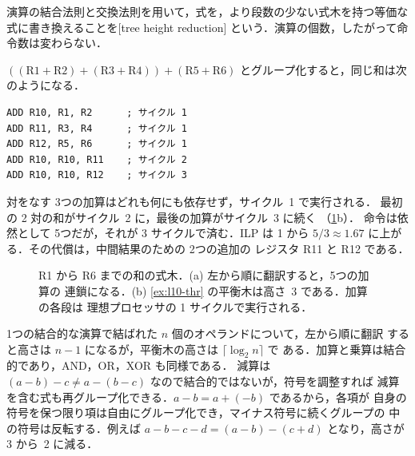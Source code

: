 \documentclass[../main.tex]{subfiles}
\begin{document}
\begin{definition}[木の高さ削減]
  \label{def:l10-thr}
  演算の結合法則と交換法則を用いて，式を，より段数の少ない式木を持つ等価な
  式に書き換えることを[tree height reduction]%
  という．演算の個数，したがって命令数は変わらない．
\end{definition}

\begin{example}
  \label{ex:l10-thr}
  $((\text{R1}+\text{R2}) + (\text{R3}+\text{R4})) +
  (\text{R5}+\text{R6})$ とグループ化すると，同じ和は次のようになる．
  \begin{lstlisting}[language={[x86masm]Assembler}, numbers=none]
ADD R10, R1, R2      ; サイクル 1
ADD R11, R3, R4      ; サイクル 1
ADD R12, R5, R6      ; サイクル 1
ADD R10, R10, R11    ; サイクル 2
ADD R10, R10, R12    ; サイクル 3
\end{lstlisting}
  対をなす 3つの加算はどれも何にも依存せず，サイクル~1 で実行される．
  最初の 2 対の和がサイクル~2 に，最後の加算がサイクル~3 に続く
  （\cref{fig:l10-tree-height}b）．
  命令は依然として 5つだが，それが 3 サイクルで済む．ILP は 1 から
  $5/3 \approx 1.67$ に上がる．その代償は，中間結果のための 2つの追加の
  レジスタ R11 と R12 である．
\end{example}

\begin{figure}[htbp]
  \centering
  
  \caption{R1 から R6 までの和の式木．(a) 左から順に翻訳すると，5つの加算の
    連鎖になる．(b) \cref{ex:l10-thr} の平衡木は高さ~3 である．加算の各段は
    理想プロセッサの 1 サイクルで実行される．}
  \label{fig:l10-tree-height}
\end{figure}

1つの結合的な演算で結ばれた $n$ 個のオペランドについて，左から順に翻訳
すると高さは $n-1$ になるが，平衡木の高さは $\lceil \log_2 n \rceil$ で
ある．加算と乗算は結合的であり，AND，OR，XOR も同様である．
減算は $(a-b)-c \ne a-(b-c)$ なので結合的ではないが，符号を調整すれば
減算を含む式も再グループ化できる．$a - b = a + (-b)$ であるから，各項が
自身の符号を保つ限り項は自由にグループ化でき，マイナス符号に続くグループの
中の符号は反転する．例えば $a-b-c-d = (a-b)-(c+d)$ となり，高さが 3 から~2
に減る．
\end{document}
